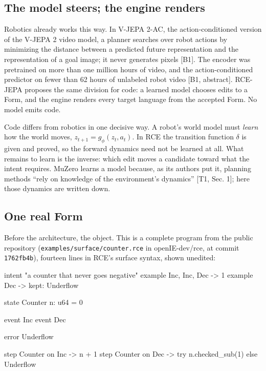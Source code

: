 \documentclass[10pt,letterpaper]{article}
\newenvironment{Shaded}{}{}
\newcommand{\NormalTok}[1]{#1}
\begin{document}
\subsection{The model steers; the engine
renders}\label{the-model-steers-the-engine-renders}

Robotics already works this way. In V-JEPA 2-AC, the action-conditioned
version of the V-JEPA 2 video model, a planner searches over robot
actions by minimizing the distance between a predicted future
representation and the representation of a goal image; it never
generates pixels {[}B1{]}. The encoder was pretrained on more than one
million hours of video, and the action-conditioned predictor on fewer
than 62 hours of unlabeled robot video {[}B1, abstract{]}. RCE-JEPA
proposes the same division for code: a learned model chooses edits to a
Form, and the engine renders every target language from the accepted
Form. No model emits code.

Code differs from robotics in one decisive way. A robot's world model
must \emph{learn} how the world moves, \(z_{t+1}=g_\phi(z_t,a_t)\). In
RCE the transition function \(\delta\) is given and proved, so the
forward dynamics need not be learned at all. What remains to learn is
the inverse: which edit moves a candidate toward what the intent
requires. MuZero learns a model because, as its authors put it, planning
methods ``rely on knowledge of the environment's dynamics'' {[}T1, Sec.
1{]}; here those dynamics are written down.

\subsection{One real Form}\label{one-real-form}

Before the architecture, the object. This is a complete program from the
public repository (\texttt{examples/\allowbreak{}surface/\allowbreak{}counter.\allowbreak{}rce} in
openIE-dev/rce, at commit \texttt{1762fb4b}), fourteen lines in RCE's
surface syntax, shown unedited:

\begin{Shaded}
\begin{Highlighting}[]
\NormalTok{intent "a counter that never goes negative"}
\NormalTok{    example Inc, Inc, Dec {-}\textgreater{} 1}
\NormalTok{    example Dec {-}\textgreater{} kept: Underflow}

\NormalTok{state Counter}
\NormalTok{    n: u64 = 0}

\NormalTok{event Inc}
\NormalTok{event Dec}

\NormalTok{error Underflow}

\NormalTok{step Counter on Inc {-}\textgreater{} n + 1}
\NormalTok{step Counter on Dec {-}\textgreater{} try n.checked\_sub(1) else Underflow}
\end{Highlighting}
\end{Shaded}
\end{document}
